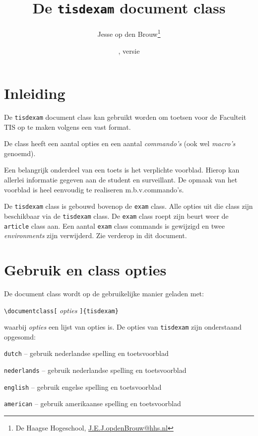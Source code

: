 \documentclass[dutch,a4paper,12pt,addpoints,fleqn,oneside]{tisdexam}
\newcommand\DocClass[1]{\texttt{#1}}
\newcommand\Option[1]{\texttt{#1}}
\begin{document}
\title{De \DocClass{tisdexam} document class}
\author{Jesse op den Brouw\thanks{De Haagse Hogeschool,
        \url{J.E.J.opdenBrouw@hhs.nl}}}
\date{\tisdexamfiledate, versie \tisdexamfileversion}
\maketitle
\setcounter{footnote}{1}


\section{Inleiding}
\label{sec:abstract}
De \DocClass{tisdexam} document class kan gebruikt worden om toetsen voor
de Faculteit TIS op te maken volgens een vast format.

\medskip
De class heeft een aantal opties en een aantal \textsl{commando's} (ook wel
\textsl{macro's} genoemd).

\medskip
Een belangrijk onderdeel van een toets is het verplichte voorblad. Hierop kan
allerlei informatie gegeven aan de student en surveillant. De opmaak van het
voorblad is heel eenvoudig te realiseren m.b.v.\@ commando's.

\medskip
De \DocClass{tisdexam} class is gebouwd bovenop de \DocClass{exam}
class. Alle opties uit die class zijn beschikbaar via de
\DocClass{tisdexam} class. De \DocClass{exam} class roept zijn
beurt weer de \DocClass{article} class aan.
Een aantal \DocClass{exam} class commands is gewijzigd en twee
\textsl{environments} zijn verwijderd. Zie verderop in dit document.


\section{Gebruik en class opties}
De document class wordt op de gebruikelijke manier geladen met:
\bigskip

\verb|\documentclass[| \textsl{opties} \verb|]{tisdexam}|
\bigskip

\noindent
waarbij \textsl{opties} een lijst van opties is. De opties van \DocClass{tisdexam} zijn
onderstaand opgesomd:
\smallskip

\Option{dutch} -- gebruik nederlandse spelling en toetsvoorblad

\Option{nederlands} -- gebruik nederlandse spelling  en toetsvoorblad

\Option{english} -- gebruik engelse spelling en toetsvoorblad

\Option{american} -- gebruik amerikaanse spelling en toetsvoorblad
\end{document}
